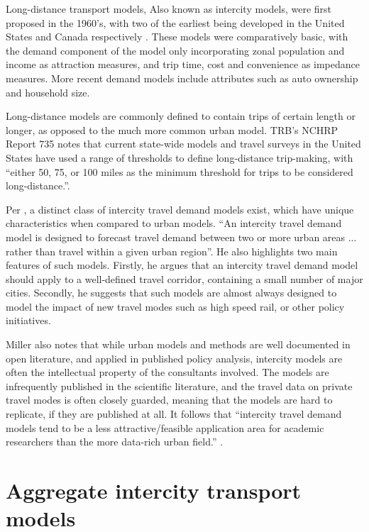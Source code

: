 Long-distance transport models, Also known as intercity models, were first proposed in the 1960’s, with two of the earliest being developed in the United States and Canada respectively \parencite{CTC71}. These models were comparatively basic, with the demand component of the model only incorporating zonal population and income as attraction measures, and trip time, cost and convenience as impedance measures. More recent demand models include attributes such as auto ownership and household size. 

Long-distance models are commonly defined to contain trips of certain length or longer, as opposed to the much more common urban model. TRB's NCHRP Report 735 notes that current state-wide models and travel surveys in the United States have used a range of thresholds to define long-distance trip-making, with \enquote{either 50, 75, or 100 miles as the minimum threshold for trips to be considered long-distance.}\autocite{schif12}.

Per \textcite{miller04}, a distinct class of intercity travel demand models exist, which have unique characteristics when compared to urban models. \enquote{An intercity travel demand model is designed to forecast travel demand between two or more urban areas ... rather than travel within a given urban region}. He also highlights two main features of such models. Firstly, he argues that an intercity travel demand model should apply to a well-defined travel corridor, containing a small number of major cities. Secondly, he suggests that such models are almost always designed to model the impact of new travel modes such as high speed rail, or other policy initiatives.

Miller also notes that while urban models and methods are well documented in open literature, and applied in published policy analysis, intercity models are often the intellectual property of the consultants involved. The models are infrequently published in the scientific literature, and the travel data on private travel modes is often closely guarded, meaning that the models are hard to replicate, if they are published at all. It follows that \enquote{intercity travel demand models tend to be a less attractive/feasible application area for academic researchers than the more data-rich urban field.} \parencite{miller04}.

\section{Aggregate intercity transport models}

